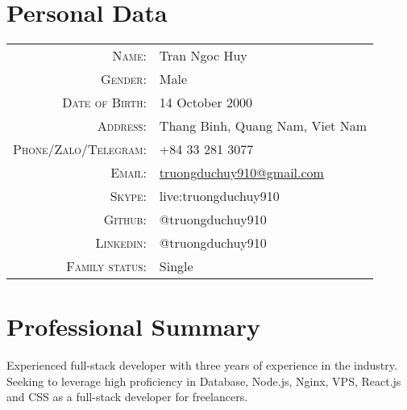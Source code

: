 \documentclass[10pt]{article} %
\begin{document}
\pagestyle{fancy}
\renewcommand{\headrulewidth}{0pt}

\par{\bigskip\par} %
\par{\bigskip\par} %

\section{Personal Data}

\begin{tabular}{rl}
  \textsc{Name:} 						& Tran Ngoc Huy \\
  \textsc{Gender:}                  	& Male \\
  \textsc{Date of Birth:} 	  		& 14 October 2000 \\
  \textsc{Address:} 					& Thang Binh, Quang Nam, Viet Nam \\
  \textsc{Phone/Zalo/Telegram:} 					& +84 33 281 3077 \\
  \textsc{Email:} 					& \href{mailto:truongduchuy910@gmail.com}{truongduchuy910@gmail.com} \\
  \textsc{Skype:} 					& live:truongduchuy910 \\
  \textsc{Github:}				& @truongduchuy910 \\
  \textsc{Linkedin:}				& @truongduchuy910 \\
  \textsc{Family status:}				& Single \\
\end{tabular}



\section{Professional Summary}
Experienced full-stack developer with three years of experience in the industry. Seeking to leverage high proficiency in Database, Node.js, Nginx, VPS, React.js and CSS as a full-stack developer for freelancers.
\end{document}
